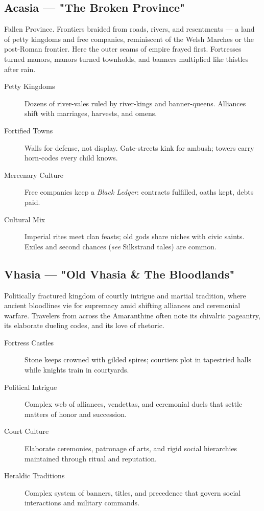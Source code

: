 \subsection*{Acasia — "The Broken Province"}

Fallen Province. Frontiers braided from roads, rivers, and resentments — a land of petty kingdoms and free companies, reminiscent of the Welsh Marches or the post-Roman frontier. Here the outer seams of empire frayed first. Fortresses turned manors, manors turned townholds, and banners multiplied like thistles after rain.

\begin{description}
\item[Petty Kingdoms] Dozens of river-vales ruled by river-kings and banner-queens. Alliances shift with marriages, harvests, and omens.
\item[Fortified Towns] Walls for defense, not display. Gate-streets kink for ambush; towers carry horn-codes every child knows.
\item[Mercenary Culture] Free companies keep a \emph{Black Ledger}: contracts fulfilled, oaths kept, debts paid.
\item[Cultural Mix] Imperial rites meet clan feasts; old gods share niches with civic saints. Exiles and second chances (\emph{see} Silkstrand tales) are common.
\end{description}

\subsection*{Vhasia — "Old Vhasia \& The Bloodlands"}

Politically fractured kingdom of courtly intrigue and martial tradition, where ancient bloodlines vie for supremacy amid shifting alliances and ceremonial warfare. Travelers from across the Amaranthine often note its chivalric pageantry, its elaborate dueling codes, and its love of rhetoric.

\begin{description}
\item[Fortress Castles] Stone keeps crowned with gilded spires; courtiers plot in tapestried halls while knights train in courtyards.
\item[Political Intrigue] Complex web of alliances, vendettas, and ceremonial duels that settle matters of honor and succession.
\item[Court Culture] Elaborate ceremonies, patronage of arts, and rigid social hierarchies maintained through ritual and reputation.
\item[Heraldic Traditions] Complex system of banners, titles, and precedence that govern social interactions and military commands.
\end{description}

